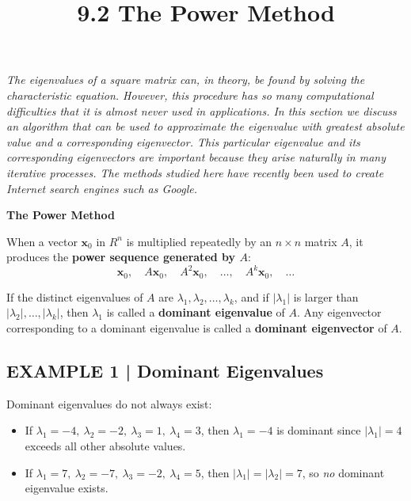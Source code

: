 \documentclass{article}
\title{9.2 The Power Method}
\date{}
\author{}
\newcommand{\redheading}[1]{{\vspace{2mm}\noindent\Large\bfseries\color{red!55!black} #1\par}\vspace{2mm}}
\begin{document}
\maketitle

{\itshape\color{blue!45!black}
The eigenvalues of a square matrix can, in theory, be found by solving the characteristic
equation. However, this procedure has so many computational difficulties that it is almost
never used in applications. In this section we discuss an algorithm that can be used to
approximate the eigenvalue with greatest absolute value and a corresponding eigenvector.
This particular eigenvalue and its corresponding eigenvectors are important because they
arise naturally in many iterative processes. The methods studied here have recently been
used to create Internet search engines such as Google.\par}

\vspace{2mm}

\redheading{The Power Method}

When a vector $\mathbf{x}_0$ in $R^n$ is multiplied repeatedly by an $n\times n$ matrix
$A$, it produces the \textbf{power sequence generated by $A$}:
\[
  \mathbf{x}_0,\quad A\mathbf{x}_0,\quad A^2\mathbf{x}_0,\quad\ldots,\quad
  A^k\mathbf{x}_0,\quad\ldots
\]

\begin{tcolorbox}[colback=teal!4, colframe=teal!65!black,
  title={\textbf{Definition 1}}, boxrule=0.5mm, arc=3mm]
If the distinct eigenvalues of $A$ are $\lambda_1,\lambda_2,\ldots,\lambda_k$, and if
$|\lambda_1|$ is larger than $|\lambda_2|,\ldots,|\lambda_k|$, then $\lambda_1$ is called
a \textbf{dominant eigenvalue} of $A$. Any eigenvector corresponding to a dominant
eigenvalue is called a \textbf{dominant eigenvector} of $A$.
\end{tcolorbox}

\subsection*{EXAMPLE 1 | Dominant Eigenvalues}

Dominant eigenvalues do not always exist:
\begin{itemize}
  \item If $\lambda_1=-4,\ \lambda_2=-2,\ \lambda_3=1,\ \lambda_4=3$, then
        $\lambda_1=-4$ is dominant since $|\lambda_1|=4$ exceeds all other absolute values.
  \item If $\lambda_1=7,\ \lambda_2=-7,\ \lambda_3=-2,\ \lambda_4=5$, then
        $|\lambda_1|=|\lambda_2|=7$, so \emph{no} dominant eigenvalue exists.
\end{itemize}
\end{document}
